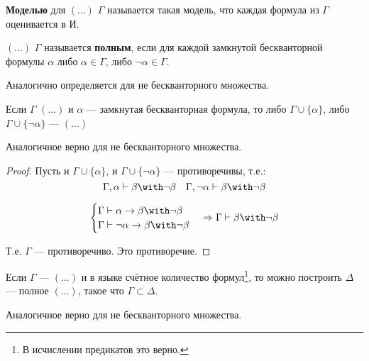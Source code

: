 \begin{definition}
    \textbf{Моделью} для \((\ldots)\) \(\Gamma\) называется такая модель, что каждая формула из \(\Gamma\) оценивается в \(\text{И}\).
\end{definition}

\begin{definition}
    \((\ldots)\) \(\Gamma\) называется \textbf{полным}, если для каждой замкнутой бескванторной формулы \(\alpha\) либо \(\alpha \in \Gamma\), либо \(\neg \alpha \in \Gamma\).

    Аналогично определяется для не бескванторного множества.
\end{definition}

\begin{theorem}
    Если \(\Gamma\) \((\ldots)\) и \(\alpha\) --- замкнутая бескванторная формула, то либо \(\Gamma \cup \{\alpha\} \), либо \(\Gamma \cup \{\neg \alpha\}\) --- \((\ldots)\)

    Аналогичное верно для не бескванторного множества.
\end{theorem}
\begin{proof}
    Пусть и \(\Gamma \cup \{\alpha\} \), и \(\Gamma \cup \{\neg \alpha\} \) --- противоречивы, т.е.:
    \[\Gamma, \alpha \vdash \beta \with \neg \beta \quad \Gamma, \neg \alpha \vdash \beta \with \neg \beta\]

    \[\begin{cases} \Gamma \vdash \alpha \to \beta \with \neg \beta \\ \Gamma \vdash \neg \alpha \to \beta \with \neg \beta \end{cases} \Rightarrow \Gamma \vdash \beta \with \neg \beta \]

    Т.е. \(\Gamma\) --- противоречиво. Это противоречие.
\end{proof}

\begin{theorem}
    Если \(\Gamma\) --- \((\ldots)\) и в языке счётное количество формул\footnote{В исчислении предикатов это верно.}, то можно построить \(\Delta\) --- полное \((\ldots)\), такое что \(\Gamma \subset \Delta\).

    Аналогичное верно для не бескванторного множества.
\end{theorem}

